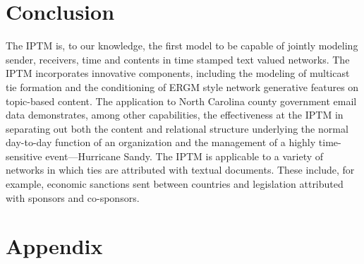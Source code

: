 \section{Conclusion} 
The IPTM is, to our knowledge, the first model to be capable of jointly modeling sender, receivers, time and contents in time stamped text valued networks. The IPTM incorporates innovative components, including the modeling of multicast tie formation and the conditioning of ERGM style network generative features on topic-based content. The application to North Carolina county government email data demonstrates, among other capabilities, the effectiveness at the IPTM in separating out both the content and relational structure underlying the normal day-to-day function of an organization and the management of a highly time-sensitive event---Hurricane Sandy. The IPTM is applicable to a variety of networks in which ties are attributed with textual documents. These include, for example, economic sanctions sent between countries and legislation attributed with sponsors and co-sponsors. 
 \clearpage


\newpage
\appendix
 \section*{Appendix}
 \renewcommand{\thesubsection}{\Alph{subsection}}

